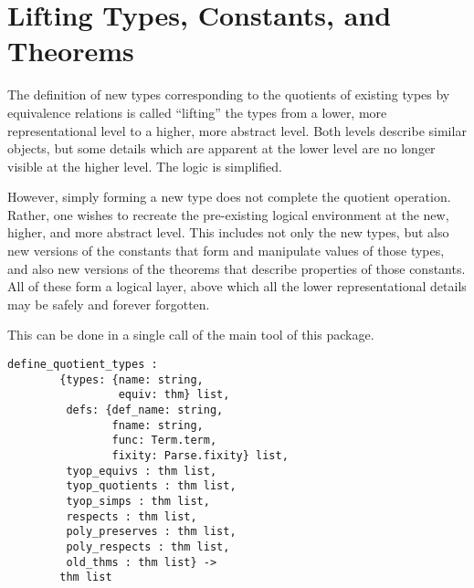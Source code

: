 \documentclass[envcountsame,runningheads]{llncs}
\begin{document}
%
\section{Lifting Types, Constants, and Theorems}
%
\label{liftingall}

The definition of new types corresponding to the quotients of
existing types by equivalence relations is called ``lifting''
the types from a lower, more representational level to a higher,
more abstract level.  Both levels describe similar objects, but
some details which are apparent at the lower level are no longer
visible at the higher level.  The logic is simplified.

However, simply forming a new type does not complete the quotient operation.
Rather, one wishes to recreate the 
pre-existing logical environment at the new,
higher, and more abstract level.  This includes not only the new
types, but also new versions of the constants that form and 
manipulate values of those types, and also new versions of the
theorems that describe properties of those constants.  All of these
form a logical layer, above which all the lower representational details
may be safely and forever forgotten.

%

This can be done in a single call of the
main tool of this package. 

\begin{verbatim}
define_quotient_types : 
        {types: {name: string,
                 equiv: thm} list,
         defs: {def_name: string,
                fname: string,
                func: Term.term,
                fixity: Parse.fixity} list,
         tyop_equivs : thm list,
         tyop_quotients : thm list,
         tyop_simps : thm list,
         respects : thm list,
         poly_preserves : thm list,
         poly_respects : thm list,
         old_thms : thm list} ->
        thm list
\end{verbatim}
\end{document}
